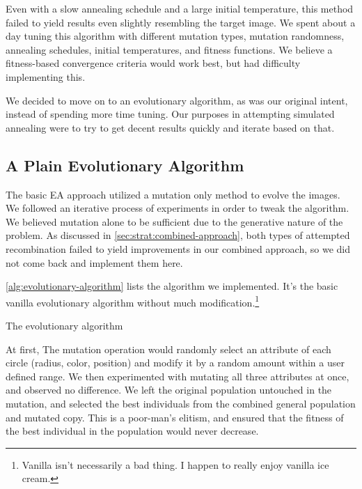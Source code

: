\documentclass{article}
\begin{document}
Even with a slow annealing schedule and a large initial temperature, this method failed to yield
results even slightly resembling the target image. We spent about a day tuning this algorithm with
different mutation types, mutation randomness, annealing schedules, initial temperatures, and
fitness functions. We believe a fitness-based convergence criteria would work best, but had
difficulty implementing this.

We decided to move on to an evolutionary algorithm, as was our original intent, instead of spending
more time tuning. Our purposes in attempting simulated annealing were to try to get decent results
quickly and iterate based on that.

\subsection{A Plain Evolutionary Algorithm}\label{sec:strat:evolutionary-algorithm}
The basic EA approach utilized a mutation only method to evolve the images. We followed an
iterative process of experiments in order to tweak the algorithm. We believed mutation alone to be
sufficient due to the generative nature of the problem. As discussed in
\autoref{sec:strat:combined-approach}, both types of attempted recombination failed to yield
improvements in our combined approach, so we did not come back and implement them here.

\autoref{alg:evolutionary-algorithm} lists the algorithm we implemented. It's the basic vanilla
evolutionary algorithm without much modification.\footnote{Vanilla isn't necessarily a bad thing. I
    happen to really enjoy vanilla ice cream.}

\begin{algorithm}[h]
    \begin{algorithmic}
            \IComment{\dots}
            \EndWhile{}
        \EndFunction{}
    \end{algorithmic}
    \caption{The evolutionary algorithm}\label{alg:evolutionary-algorithm}
\end{algorithm}

At first, The mutation operation would randomly select an attribute of each circle (radius, color,
position) and modify it by a random amount within a user defined range. We then experimented with
mutating all three attributes at once, and observed no difference. We left the original population
untouched in the mutation, and selected the best individuals from the combined general population
and mutated copy. This is a poor-man's elitism, and ensured that the fitness of the best individual
in the population would never decrease.
\end{document}
